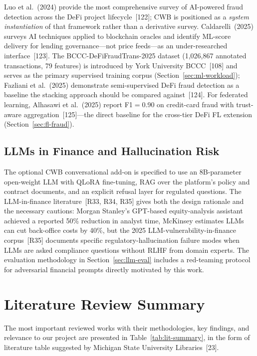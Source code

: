 \documentclass[12pt,a4paper]{report}
\begin{document}
Luo et al.~(2024) provide the most comprehensive survey of AI-powered fraud detection across the DeFi project lifecycle~[122]; CWB is positioned as a \textit{system instantiation} of that framework rather than a derivative survey. Caldarelli~(2025) surveys AI techniques applied to blockchain oracles and identify ML-score delivery for lending governance---not price feeds---as an under-researched interface~[123]. The BCCC-DeFiFraudTrans-2025 dataset (1,026,867 annotated transactions, 79 features) is introduced by York University BCCC~[108] and serves as the primary supervised training corpus (Section~\ref{sec:ml-workload}); Fazliani et al.~(2025) demonstrate semi-supervised DeFi fraud detection as a baseline the stacking approach should be compared against~[124]. For federated learning, Alhasawi et al.~(2025) report F1$=$0.90 on credit-card fraud with trust-aware aggregation~[125]---the direct baseline for the cross-tier DeFi FL extension (Section~\ref{sec:fl-fraud}).

\subsection{LLMs in Finance and Hallucination Risk}
\label{sec:lit-llm}

The optional CWB conversational add-on is specified to use an 8B-parameter open-weight LLM with QLoRA fine-tuning, RAG over the platform's policy and contract documents, and an explicit refusal layer for regulated questions. The LLM-in-finance literature~[R33, R34, R35] gives both the design rationale and the necessary cautions: Morgan Stanley's GPT-based equity-analysis assistant achieved a reported 50\% reduction in analyst time, McKinsey estimates LLMs can cut back-office costs by 40\%, but the 2025 LLM-vulnerability-in-finance corpus~[R35] documents specific regulatory-hallucination failure modes when LLMs are asked compliance questions without RLHF from domain experts. The evaluation methodology in Section~\ref{sec:llm-eval} includes a red-teaming protocol for adversarial financial prompts directly motivated by this work.

\section{Literature Review Summary}

The most important reviewed works with their methodologies, key findings, and relevance to our project are presented in Table~\ref{tab:lit-summary}, in the form of literature table suggested by Michigan State University Libraries~[23].
\end{document}
